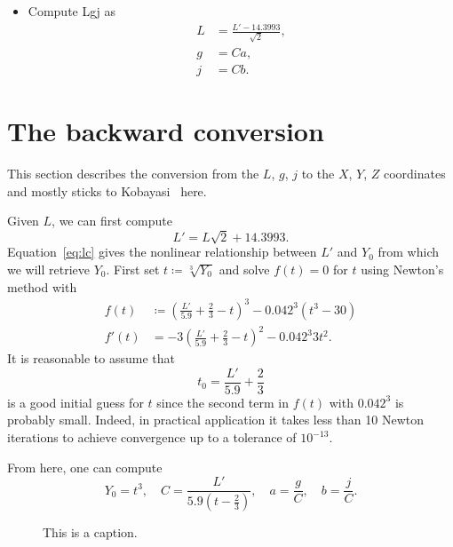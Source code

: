 \documentclass{scrartcl}
\theoremstyle{named}
\begin{document}
\begin{itemize}
  \item Compute Lgj as
    \[
      \begin{split}
        L &= \frac{L' - 14.3993}{\sqrt{2}},\\
        g &= Ca,\\
        j &= Cb.
      \end{split}
    \]
\end{itemize}

\section{The backward conversion}

This section describes the conversion from the  $L$, $g$, $j$ to the $X$, $Y$, $Z$
coordinates and mostly sticks to Kobayasi~\cite{kobayasi} here.

Given $L$, we can first compute
\[
  L' = L \sqrt{2} + 14.3993.
\]
Equation~\ref{eq:lc} gives the nonlinear relationship between $L'$ and $Y_0$ from which
we will retrieve $Y_0$. First set $t\coloneqq \sqrt[3]{Y_0}$ and solve $f(t)=0$ for $t$
using Newton's method with
\[
  \begin{split}
    f(t) &\coloneqq {\left(\frac{L'}{5.9} + \frac{2}{3} - t\right)}^3 - 0.042^3 (t^3 - 30)\\
    f'(t) &= -3 {\left(\frac{L'}{5.9} + \frac{2}{3} - t\right)}^2 - 0.042^3 3 t^2.
  \end{split}
\]
It is reasonable to assume that
\[
  t_0 = \frac{L'}{5.9} + \frac{2}{3}
\]
is a good initial guess for $t$ since the second term in $f(t)$ with $0.042^3$ is
probably small.
Indeed, in practical application it takes less than 10 Newton iterations to achieve
convergence up to a tolerance of $10^{-13}$.

From here, one can compute
\[
  Y_0 = t^3,\quad
  C = \frac{L'}{5.9 \left(t - \frac{2}{3}\right)},\quad
  a = \frac{g}{C},\quad
  b = \frac{j}{C}.
\]


\begin{figure}
  \centering
  \hfill
  
  \hfill
  
  \hfill
  \caption{This is a caption.}
\end{figure}

{}

\end{document}
